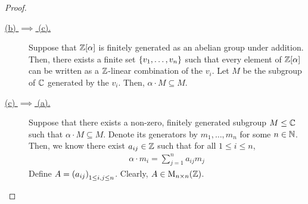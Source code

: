 \begin{proof}
\begin{description}
        \item[\underline{(b) $\implies$ (c).}] Suppose that $\mathbb{Z}\!\left[ \alpha \right]$ is finitely generated as an abelian group under addition. Then, there exists a finite set $\left\{ v_1, \ldots, v_n \right\}$ such that every element of $\mathbb{Z}\!\left[ \alpha \right]$ can be written as a $\mathbb{Z}$-linear combination of the $v_i$. Let $M$ be the subgroup of $\mathbb{C}$ generated by the $v_i$. Then, $\alpha \cdot M \subseteq M$.
        
        \item[\underline{(c) $\implies$ (a).}] Suppose that there exists a non-zero, finitely generated subgroup $M \leq \mathbb{C}$ such that $\alpha \cdot M \subseteq M$. Denote its generators by $m_1, \ldots, m_n$ for some $n \in \mathbb{N}$. Then, we know there exist $a_{ij} \in \mathbb{Z}$ such that for all $1 \leq i \leq n$,
        \begin{align*}
            \alpha \cdot m_i = \sum_{j=1}^{n} a_{ij} m_j
        \end{align*}
        Define $A = \left( a_{ij} \right)_{1 \leq i, j \leq n}$. Clearly, $A \in \operatorname{M}_{{n} \times {n}}\!\left( {\mathbb{Z}} \right)$.
        \sorry
    \end{description}
    
\end{proof}
